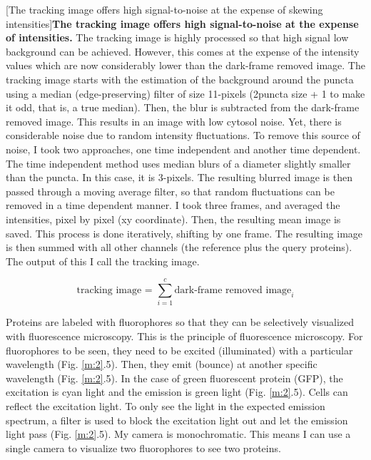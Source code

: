 \begin{centering}
[The tracking image offers high signal-to-noise at the expense of skewing intensities]{\textbf{The tracking image offers high signal-to-noise at the expense of intensities.} The tracking image is highly processed so that high signal low background can be achieved. However, this comes at the expense of the intensity values which are now considerably lower than the dark-frame removed image. The tracking image starts with the estimation of the background around the puncta using a median (edge-preserving) filter of size 11-pixels (2\times puncta size + 1 to make it odd, that is, a true median). Then, the blur is subtracted from the dark-frame removed image. This results in an image with low cytosol noise. Yet, there is considerable noise due to random intensity fluctuations. To remove this source of noise, I took two approaches, one time independent and another time dependent. The time independent method uses median blurs of a diameter slightly smaller than the puncta. In this case, it is 3-pixels. The resulting blurred image is then passed through a moving average filter, so that random fluctuations can be removed in a time dependent manner. I took three frames, and averaged the intensities, pixel by pixel (xy coordinate). Then, the resulting mean image is saved. This process is done iteratively, shifting by one frame. The resulting image is then summed with all other channels (the reference plus the query proteins). The output of this I call the tracking image.}
\label{m:S2}
\end{centering}
 
\begin{equation}
\text{tracking image = }\sum_{i = 1}^{c}\text{dark-frame removed image}_i
\end{equation}

Proteins are labeled with fluorophores so that they can be selectively visualized with fluorescence microscopy. This is the principle of fluorescence microscopy. For fluorophores to be seen, they need to be excited (illuminated) with a particular wavelength (Fig. \ref{m:2}.5). Then, they emit (bounce) at another specific wavelength (Fig. \ref{m:2}.5). In the case of green fluorescent protein (GFP), the excitation is cyan light and the emission is green light (Fig. \ref{m:2}.5). Cells can reflect the excitation light. To only see the light in the expected emission spectrum, a filter is used to block the excitation light out and let the emission light pass (Fig. \ref{m:2}.5). My camera is monochromatic. This means I can use a single camera to visualize two fluorophores to see two proteins.

